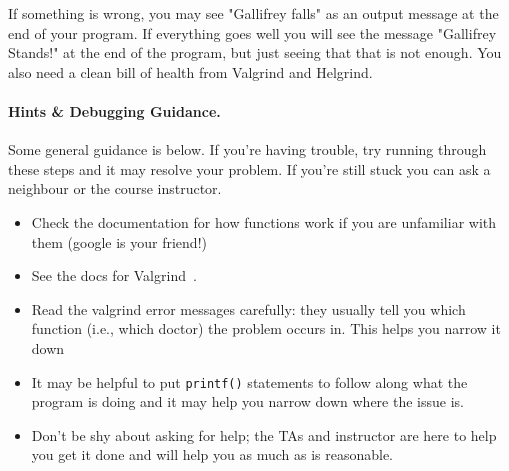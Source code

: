 If something is wrong, you may see "Gallifrey falls" as an output message at the end of your program. If everything goes well you will see the message "Gallifrey Stands!" at the end of the program, but just seeing that that is not enough. You also need a clean bill of health from Valgrind and Helgrind.

\paragraph{Hints \& Debugging Guidance.}

Some general guidance is below. If you're having trouble, try running through these steps and it may resolve your problem. If you're still stuck you can ask a neighbour or the course instructor.
\begin{itemize}
	\item Check the documentation for how functions work if you are unfamiliar with them (google is your friend!)
	\item See the docs for Valgrind~\cite{valgrind:tools}.
	\item Read the valgrind error messages carefully: they usually tell you which function (i.e., which doctor) the problem occurs in. This helps you narrow it down 
	\item It may be helpful to put \texttt{printf()} statements to follow along what the program is doing and it may help you narrow down where the issue is.
	\item Don't be shy about asking for help; the TAs and instructor are here to help you get it done and will help you as much as is reasonable.
\end{itemize}




